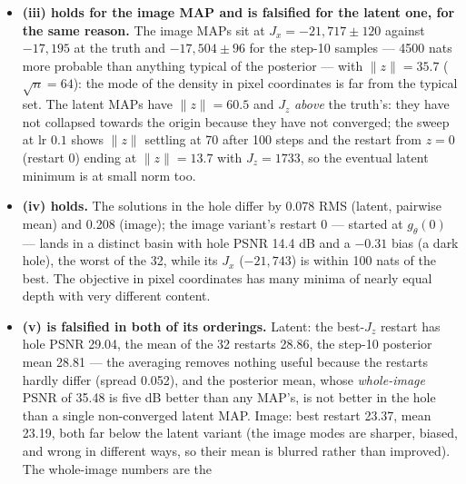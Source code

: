 \documentclass[11pt]{article}
\begin{document}
\begin{itemize}
        holds --- the paired latent and image solutions differ by 0.203 RMS
        in the hole (range 0.10--0.43), the log-Jacobian is $-18{,}211$ at
        the latent solutions and $-21{,}273$ at the image ones (a difference
        of 3000 nats, comparable to the data terms themselves), so the two
        modes are far apart and the reparametrisation matters as much as
        the likelihood.
  \item \textbf{(iii) holds for the image MAP and is falsified for the
        latent one, for the same reason.} The image MAPs sit at $J_x =
        -21{,}717 \pm 120$ against $-17{,}195$ at the truth and $-17{,}504
        \pm 96$ for the step-10 samples --- 4500 nats more probable than
        anything typical of the posterior --- with $\|z\| = 35.7$ ($\sqrt{n}
        = 64$): the mode of the density in pixel coordinates is far from the
        typical set. The latent MAPs have $\|z\| = 60.5$ and $J_z$
        \emph{above} the truth's: they have not collapsed towards the origin
        because they have not converged; the sweep at lr $0.1$ shows $\|z\|$
        settling at 70 after 100 steps and the restart from $z = 0$ (restart
        0) ending at $\|z\| = 13.7$ with $J_z = 1733$, so the eventual
        latent minimum is at small norm too.
  \item \textbf{(iv) holds.} The solutions in the hole differ by 0.078 RMS
        (latent, pairwise mean) and 0.208 (image); the image variant's
        restart 0 --- started at $g_\theta(0)$ --- lands in a distinct basin
        with hole PSNR 14.4 dB and a $-0.31$ bias (a dark hole), the worst
        of the 32, while its $J_x$ ($-21{,}743$) is within 100 nats of the
        best. The objective in pixel coordinates has many minima of nearly
        equal depth with very different content.
  \item \textbf{(v) is falsified in both of its orderings.} Latent: the
        best-$J_z$ restart has hole PSNR 29.04, the mean of the 32 restarts
        28.86, the step-10 posterior mean 28.81 --- the averaging removes
        nothing useful because the restarts hardly differ (spread 0.052),
        and the posterior mean, whose \emph{whole-image} PSNR of 35.48 is
        five dB better than any MAP's, is not better in the hole than a
        single non-converged latent MAP. Image: best restart 23.37, mean
        23.19, both far below the latent variant (the image modes are
        sharper, biased, and wrong in different ways, so their mean is
        blurred rather than improved). The whole-image numbers are the

\end{itemize}
\end{document}
